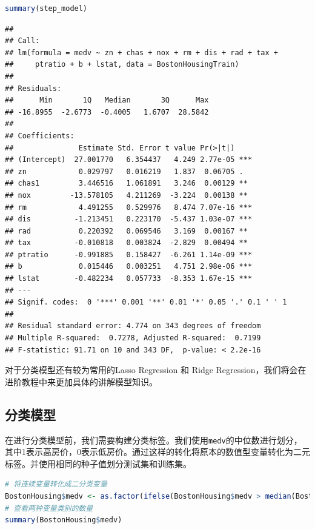 \documentclass[]{ctexbook}
\newcommand{\passthrough}[1]{#1}
\begin{document}
\begin{lstlisting}[language=R]
summary(step_model)
\end{lstlisting}

\begin{lstlisting}
## 
## Call:
## lm(formula = medv ~ zn + chas + nox + rm + dis + rad + tax + 
##     ptratio + b + lstat, data = BostonHousingTrain)
## 
## Residuals:
##      Min       1Q   Median       3Q      Max 
## -16.8955  -2.6773  -0.4005   1.6707  28.5842 
## 
## Coefficients:
##               Estimate Std. Error t value Pr(>|t|)    
## (Intercept)  27.001770   6.354437   4.249 2.77e-05 ***
## zn            0.029797   0.016219   1.837  0.06705 .  
## chas1         3.446516   1.061891   3.246  0.00129 ** 
## nox         -13.578105   4.211269  -3.224  0.00138 ** 
## rm            4.491255   0.529976   8.474 7.07e-16 ***
## dis          -1.213451   0.223170  -5.437 1.03e-07 ***
## rad           0.220392   0.069546   3.169  0.00167 ** 
## tax          -0.010818   0.003824  -2.829  0.00494 ** 
## ptratio      -0.991885   0.158427  -6.261 1.14e-09 ***
## b             0.015446   0.003251   4.751 2.98e-06 ***
## lstat        -0.482234   0.057733  -8.353 1.67e-15 ***
## ---
## Signif. codes:  0 '***' 0.001 '**' 0.01 '*' 0.05 '.' 0.1 ' ' 1
## 
## Residual standard error: 4.774 on 343 degrees of freedom
## Multiple R-squared:  0.7278, Adjusted R-squared:  0.7199 
## F-statistic: 91.71 on 10 and 343 DF,  p-value: < 2.2e-16
\end{lstlisting}

对于分类模型还有较为常用的Lasso Regression 和 Ridge Regression，我们将会在进阶教程中来更加具体的讲解模型知识。

\hypertarget{ux5206ux7c7bux6a21ux578b}{%
\subsection{分类模型}\label{ux5206ux7c7bux6a21ux578b}}

在进行分类模型前，我们需要构建分类标签。我们使用\passthrough{\lstinline!medv!}的中位数进行划分，其中1表示高房价，0表示低房价。通过这样的转化将原本的数值型变量转化为二元标签。并使用相同的种子值划分测试集和训练集。

\begin{lstlisting}[language=R]
# 将连续变量转化成二分类变量
BostonHousing$medv <- as.factor(ifelse(BostonHousing$medv > median(BostonHousing$medv), 1, 0))
# 查看两种变量类别的数量
summary(BostonHousing$medv)
\end{lstlisting}
\end{document}
